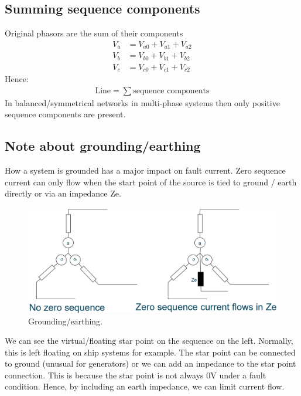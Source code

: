 \subsection{Summing sequence components}
Original phasors are the sum of their components
\begin{align}
	V_a & = V_{a0} + V_{a1} + V_{a2} \\
	V_b & = V_{b0} + V_{b1} + V_{b2} \\
	V_c & = V_{c0} + V_{c1} + V_{c2}
\end{align}
Hence:
\begin{gather}
	\textrm{Line} = \sum \textrm{sequence components}
\end{gather}
In balanced/symmetrical networks in multi-phase systems then only positive sequence components are present.
\subsection{Note about grounding/earthing}
How a system is grounded has a major impact on fault current. Zero sequence current can only flow when the start point of the source is tied to ground / earth directly or via an impedance Ze.
\begin{figure}[H]
	\centering
	\includegraphics[width = \textwidth]{./img/figure24.png}
	\caption{Grounding/earthing.}
\end{figure}
We can see the virtual/floating star point on the sequence on the left. Normally, this is left floating on ship systems for example. The star point can be connected to ground (unusual for generators) or we can add an impedance to the star point connection. This is because the star point is not always 0V under a fault condition. Hence, by including an earth impedance, we can limit current flow.

